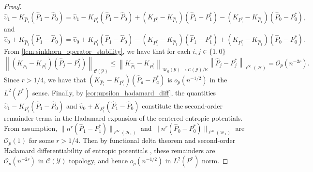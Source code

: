 \documentclass{article}
\theoremstyle{plain}
\theoremstyle{definition}
\theoremstyle{remark}
\newcommand{\R}{\mathbb{R}}
\newcommand{\cH}{\mathcal{H}}
\newcommand{\cC}{\mathcal{C}}
\newcommand{\cO}{\mathcal{O}}
\newcommand{\cM}{\mathcal{M}}
\newcommand{\cY}{\mathcal{Y}}
\newcommand{\wh}[1]{\widehat{#1}}
\newcommand{\hP}{\widehat{P}}
\newcommand{\1}{\mathbbm{1}}
\newcommand{\norm}[1]{\left \| #1 \right \|}
\theoremstyle{plain}
\theoremstyle{definition}
\begin{document}
\begin{proof}
    \[
     \wh{\upsilon}_1 - K_{\hP_1} (\hP_1 - \hP_0) =  \wh{\upsilon}_1 - K_{P_1^*} (\hP_1 - \hP_0) + (K_{P_1^*} - K_{\hP_1})(\hP_1 - P_1^*) - (K_{P_1^*} - K_{\hP_1})(\hP_0 - P_0^*),
    \]
    and 
    \[
       \wh{\upsilon}_0 + K_{\hP_1} (\hP_1 - \hP_0) =  \wh{\upsilon}_0 + K_{P_1^*} (\hP_1 - \hP_0) - (K_{P_1^*} - K_{\hP_1})(\hP_1 - P_1^*) + (K_{P_1^*} - K_{\hP_1})(\hP_0 - P_0^*). 
    \]
    From \cref{lem:sinkhorn_operator_stability}, we have that for each $i, j \in \{1,0\}$
    \[
    \norm{(K_{\hP_i} - K_{P_i^*})(\hP_j - P^*_j)}_{\cC(\cY)} \leq \norm{K_{\hP_i} - K_{P_i^*}}_{\cM_0(\cY) \to \cC(\cY) / \R} \norm{\hP_j - P^*_j}_{\ell^\infty(\cH)} = \cO_p(n^{-2r}).
    \]
    Since $r > 1/4$, we have that $(K_{\hP_1} - K_{P_1^*})(\hP_a - P_a^*)$ is $o_p(n^{-1/2})$ in the $L^2(P^*)$ sense. 
    Finally, by \cref{cor:upsilon_hadamard_diff}, the quantities $\wh{\upsilon}_1 - K_{P_1^*} (\hP_1 - \hP_0)$ and $\wh{\upsilon}_0 + K_{P_1^*} (\hP_1 - \hP_0)$ constitute the second-order remainder terms in the Hadamard expansion of the centered entropic potentials. From assumption, $\|n^r (\hP_1 - P_1^*)\|_{\ell^\infty(\cH_1)}$ and $\|n^r (\hP_0 - P_0^*)\|_{\ell^\infty(\cH_1)}$ are $\cO_p(1)$ for some $r > 1/4$. Then by functional delta theorem and second-order Hadamard differentiability of entropic potentials \citep[Theorem 4]{goldfeld2024limit}, these remainders are $\cO_p(n^{-2r})$ in $\cC(\cY)$ topology, and hence $o_p(n^{-1/2})$ in $L^2(P^*)$ norm.
\end{proof}
\end{document}

